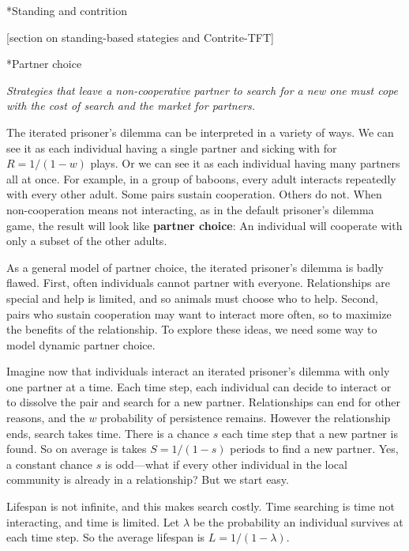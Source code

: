 \documentclass[10pt,reqno]{amsbook}
\makeatletter
\newcommand{\bemph}[1]{{\textbf{\textcolor{bemphcol}{#1}}}}
\renewcommand\section{\@startsection{section}{1}
\z@{.7\linespacing\@plus\linespacing}{.5\linespacing}
{\large\bfseries\itshape}}
\numberwithin{equation}{chapter}
\newenvironment{precis}
{\noi\itshape}
{\vspace{6pt}}
\newcommand{\noi}{\noindent}
\makeatother
\begin{document}
\section*{Standing and contrition}

[section on standing-based stategies and Contrite-TFT]

\section*{Partner choice}

\begin{precis}Strategies that leave a non-cooperative partner to search for a new one must cope with the cost of search and the market for partners.\end{precis}

The iterated prisoner's dilemma can be interpreted in a variety of ways. We can see it as each individual having a single partner and sicking with for $R=1/(1-w)$ plays. Or we can see it as each individual having many partners all at once. For example, in a group of baboons, every adult interacts repeatedly with every other adult. Some pairs sustain cooperation. Others do not. When non-cooperation means not interacting, as in the default prisoner's dilemma game, the result will look like \bemph{partner choice}: An individual will cooperate with only a subset of the other adults.

As a general model of {partner choice}, the iterated prisoner's dilemma is badly flawed. First, often individuals cannot partner with everyone. Relationships are special and help is limited, and so animals must choose who to help. Second, pairs who sustain cooperation may want to interact more often, so to maximize the benefits of the relationship. To explore these ideas, we need some way to model dynamic partner choice.

Imagine now that individuals interact an iterated prisoner's dilemma with only one partner at a time. Each time step, each individual can decide to interact or to dissolve the pair and search for a new partner. Relationships can end for other reasons, and the $w$ probability of persistence remains. However the relationship ends, search takes time. There is a chance $s$ each time step that a new partner is found. So on average is takes $S=1/(1-s)$ periods to find a new partner. Yes, a constant chance $s$ is odd---what if every other individual in the local community is already in a relationship? But we start easy.

Lifespan is not infinite, and this makes search costly. Time searching is time not interacting, and time is limited. Let $\lambda$ be the probability an individual survives at each time step. So the average lifespan is $L=1/(1-\lambda)$.
\end{document}

